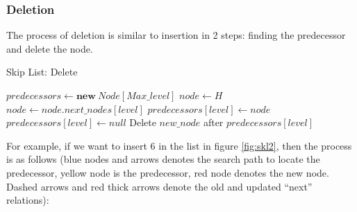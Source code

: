 \subsubsection{Deletion}
The process of deletion is similar to insertion in 2 steps: finding the predecessor and delete the node.
\begin{algorithm}[H]
    \caption{Skip List: Delete}
    \begin{algorithmic}[1]
            \State $predecessors \gets \mathbf{new}\ Node[Max\_level]$
            \State $node \gets H$
                    \State $node \gets node.next\_nodes[level]$
                \EndWhile
                    \State $predecessors[level] \gets node$
                \Else
                    \State $predecessors[level] \gets null$
                \EndIf
            \EndFor
                \State Delete $new\_node$ after $predecessors[level]$
            \EndFor
		\EndProcedure
	\end{algorithmic}
\end{algorithm}
For example, if we want to insert $6$ in the list in figure \ref{fig:skl2}, then the process is as follows (blue nodes and arrows denotes the search path to locate the predecessor, yellow node is the predecessor, red node denotes the new node. Dashed arrows and red thick arrows denote the old and updated ``next'' relations):
